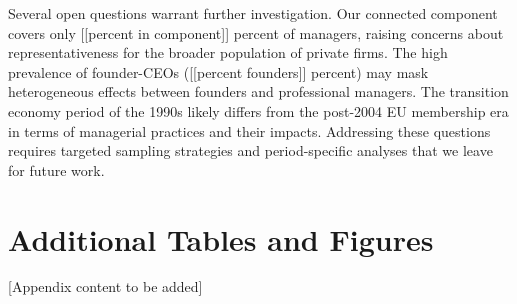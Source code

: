 \documentclass[11pt,a4paper]{article}
\begin{document}
Several open questions warrant further investigation. Our connected component covers only [[percent in component]] percent of managers, raising concerns about representativeness for the broader population of private firms. The high prevalence of founder-CEOs ([[percent founders]] percent) may mask heterogeneous effects between founders and professional managers. The transition economy period of the 1990s likely differs from the post-2004 EU membership era in terms of managerial practices and their impacts. Addressing these questions requires targeted sampling strategies and period-specific analyses that we leave for future work.




\appendix

\section{Additional Tables and Figures}

[Appendix content to be added]
\end{document}
